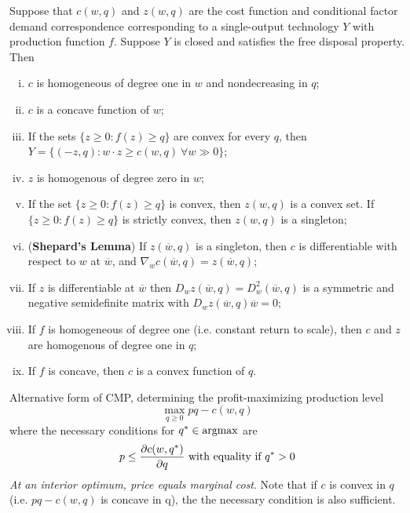 \documentclass{report}
\begin{document}
	 		\begin{proposition}[5.C.2]
	 			Suppose that $c(w, q)$ and $z(w, q)$ are the cost function and conditional factor demand correspondence corresponding to a single-output technology $Y$ with production function $f$. Suppose $Y$ is closed and satisfies the free disposal property. Then
	 			\begin{enumerate}[(i)]
	 				\item $c$ is homogeneous of degree one in $w$ and nondecreasing in $q$;
	 				\item $c$ is a concave function of $w$;
	 				\item If the sets $\{z\geq0:f(z)\geq q\}$ are convex for every $q$, then $Y=\{(-z, q): w \cdot z \geq c(w, q)\ \forall w \gg 0\}$;
	 				\item $z$ is homogenous of degree zero in $w$;
	 				\item If the set $\{z \geq 0: f(z) \geq q\}$ is convex, then $z(w, q)$ is a convex set. If $\{z \geq 0: f(z) \geq q\}$ is strictly convex, then $z(w, q)$ is a singleton;
	 				\item (\textbf{Shepard's Lemma}) If $z(\overline{w}, q)$ is a singleton, then $c$ is differentiable with respect to $w$ at $\overline{w}$, and $\nabla_w c(\overline{w}, q) = z(\overline{w}, q)$;
	 				\item If $z$ is differentiable at $\overline{w}$ then $D_w z (\overline{w}, q) = D^2_w (\overline{w}, q)$ is a symmetric and negative semidefinite matrix with $D_w z (\overline{w}, q) \overline{w} = 0$;
	 				\item If $f$ is homogeneous of degree one (i.e. constant return to scale), then $c$ and $z$ are homogenous of degree one in $q$;
	 				\item If $f$ is concave, then $c$ is a convex function of $q$.
	 			\end{enumerate}
	 		\end{proposition}
	 		
	 		\begin{corollary}
	 			Alternative form of CMP, determining the profit-maximizing production level
	 			\begin{equation}
	 				\max_{q \geq 0} p q - c(w, q)
	 			\end{equation}
	 			where the necessary conditions for $q^* \in \operatorname*{argmax}$ are
	 			\begin{equation}
	 				p \leq \frac{\partial{c(w, q^*)}}{\partial{q}}\text{{ with equality if }} q^* > 0
	 			\end{equation}
	 			\emph{At an interior optimum, price equals marginal cost}. Note that if $c$ is convex in $q$ (i.e. $p q - c(w, q)$ is concave in q), the the necessary condition is also sufficient.
	 		\end{corollary}
	 
\end{document}
